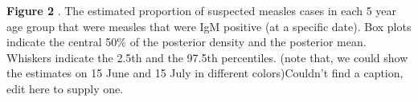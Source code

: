 \textbf{Figure 2} . The estimated proportion of suspected measles cases
in each 5 year age group that were measles that were IgM positive (at a
specific date). Box plots indicate the central 50\% of the posterior
density and the posterior mean. Whiskers indicate the 2.5th and the
97.5th percentiles. (note that, we could show the estimates on 15 June
and 15 July in different colors)Couldn't find a caption, edit here to supply one.